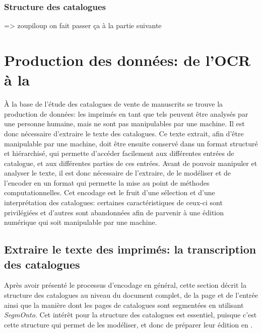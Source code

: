 \subsection{Structure des catalogues}
=> zoupiloup on fait passer ça à la partie suivante

\chapter{Production des données: de l'OCR à la \tei{}}
À la base de l'étude des catalogues de vente de manuscrits se trouve la production de données: les imprimés en tant que tels peuvent être analysés par une personne humaine, mais ne sont pas manipulables par une machine. Il est donc nécessaire d'extraire le texte des catalogues. Ce texte extrait, afin d'être manipulable par une machine, doit être ensuite conservé dans un format structuré et hiérarchisé, qui permette d'accéder facilement aux différentes entrées de catalogue, et aux différentes parties de ces entrées. Avant de pouvoir manipuler et analyser le texte, il est donc nécessaire de l'extraire, de le modéliser et de l'encoder en un format qui permette la mise au point de méthodes computationnelles. Cet encodage est le fruit d'une sélection et d'une interprétation des catalogues: certaines caractéristiques de ceux-ci sont privilégiées et d'autres sont abandonnées afin de parvenir à une édition numérique qui soit manipulable par une machine.

\section{Extraire le texte des imprimés: la transcription des catalogues}
Après avoir présenté le processus d'encodage en général, cette section décrit la structure des catalogues au niveau du document complet, de la page et de l'entrée ainsi que la manière dont les pages de catalogues sont segmentées en utilisant \textit{SegmOnto}. Cet intérêt pour la structure des catalogues est essentiel, puisque c'est cette structure qui permet de les modéliser, et donc de préparer leur édition en \xmltei{}.

